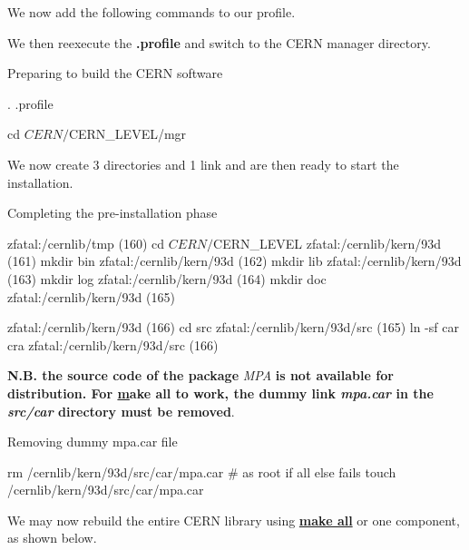 We now add the following commands to our profile.


We then reexecute the {\bf .profile} and switch to the CERN manager directory.

\begin{XMPt}{Preparing to build the CERN software}

. .profile

cd $CERN/$CERN_LEVEL/mgr

\end{XMPt}

We now create 3 directories and 1 link and are then ready to 
start the installation.

\begin{XMPt}{Completing the pre-installation phase}

zfatal:/cernlib/tmp (160) cd $CERN/$CERN_LEVEL    
zfatal:/cernlib/kern/93d (161) mkdir bin
zfatal:/cernlib/kern/93d (162) mkdir lib
zfatal:/cernlib/kern/93d (163) mkdir log
zfatal:/cernlib/kern/93d (164) mkdir doc
zfatal:/cernlib/kern/93d (165) 

zfatal:/cernlib/kern/93d (166) cd src
zfatal:/cernlib/kern/93d/src (165) ln -sf car cra
zfatal:/cernlib/kern/93d/src (166) 

\end{XMPt}

{\bf N.B. the source code of the package} {\it MPA} {\bf is not available
for distribution. For {\underline make all} to work, the dummy link
{\it mpa.car} in the {\it src/car} directory must be removed}.

\begin{XMPt}{Removing dummy mpa.car file}

rm /cernlib/kern/93d/src/car/mpa.car # as root if all else fails
touch /cernlib/kern/93d/src/car/mpa.car

\end{XMPt}

We may now rebuild the entire CERN library using {\underline {\bf make all}}
or one component, as shown below.

